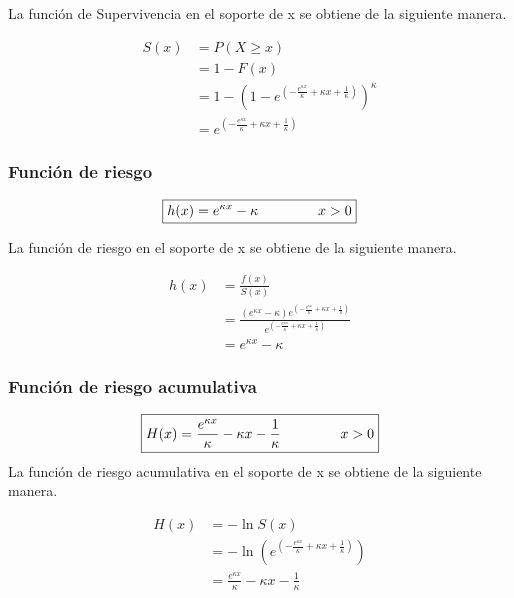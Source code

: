 \documentclass[10pt,a4paper]{article}
\begin{document}
La función de Supervivencia en el soporte de x se obtiene de la siguiente manera.

\begin{align*}
S(x) &= P(X \geqslant x) \\
     &= 1 - F(x) \\
     &= 1 - \left(1-e^{\left(-\frac{e^{\kappa x}}{\kappa} + \kappa x + \frac{1}{\kappa} \right) } \right)^\kappa  \\
     &=e^{\left(-\frac{e^{\kappa x}}{\kappa} + \kappa x + \frac{1}{\kappa} \right) }
\end{align*}

\subsubsection*{Funci\'on de riesgo}
\begin{equation*}
\boxed{
h(x) = e^{\kappa x} - \kappa  \hspace{1.5cm} x > 0}
\end{equation*}

La función de riesgo en el soporte de x se obtiene de la siguiente manera.

\begin{align*}
h(x) &= \frac{f(x)}{S(x)} \\
     &= \frac{\left( e^{\kappa x} - \kappa \right) e^{\left(-\frac{e^{\kappa x}}{\kappa} + \kappa x + \frac{1}{\kappa} \right) }}{e^{\left(-\frac{e^{\kappa x}}{\kappa} + \kappa x + \frac{1}{\kappa} \right)}} \\
     &= e^{\kappa x} - \kappa
\end{align*}

\subsubsection*{Funci\'on de riesgo acumulativa}
\begin{equation*}
\boxed{
H(x) = \frac{e^{\kappa x}}{\kappa} - \kappa x - \frac{1}{\kappa} \hspace{1.5cm} x > 0}
\end{equation*}
La función de riesgo acumulativa en el soporte de x se obtiene de la siguiente manera.

\begin{align*}
H(x) &= -\ln S(x) \\
     &= - \ln \left( e^{\left(-\frac{e^{\kappa x}}{\kappa} + \kappa x + \frac{1}{\kappa} \right) } \right)  \\
     &= \frac{e^{\kappa x}}{\kappa} - \kappa x - \frac{1}{\kappa}
\end{align*}
\end{document}
